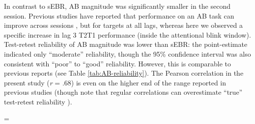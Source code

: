 \documentclass[11pt,]{memoir}
\begin{document}
In contrast to sEBR, AB magnitude was significantly smaller in the second session. Previous studies have reported that performance on an AB task can improve across sessions \autocites{Dale2013}{Slagter2007}, but for targets at all lags, whereas here we observed a specific increase in lag 3 T2\textbar{}T1 performance (inside the attentional blink window). Test-retest reliability of AB magnitude was lower than sEBR: the point-estimate indicated only ``moderate'' reliability, though the 95\% confidence interval was also consistent with ``poor'' to ``good'' reliability. However, this is comparable to previous reports (see Table \ref{tab:AB-reliability}). The Pearson correlation in the present study (\emph{r} = .68) is even on the higher end of the range reported in previous studies (though note that regular correlations can overestimate ``true'' test-retest reliability \autocite{Bland1986}).

\begingroup
\small

\LTcapwidth=\textwidth
\end{document}
